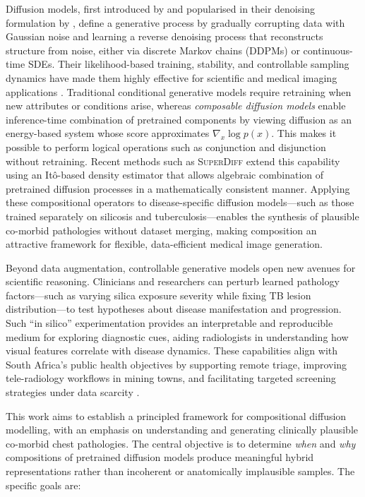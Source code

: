 Diffusion models, first introduced by \citet{pmlr-v37-sohl-dickstein15} and
popularised in their denoising formulation by \citet{NEURIPS2020_4c5bcfec},
define a generative process by gradually corrupting data with Gaussian noise and
learning a reverse denoising process that reconstructs structure from noise,
either via discrete Markov chains (DDPMs) or continuous-time SDEs. Their
likelihood-based training, stability, and controllable sampling dynamics have
made them highly effective for scientific and medical imaging applications
\citep{accelerated_mri_motion_correction_2023,score_based_diffusion_mri_2022}.
Traditional conditional generative models require retraining when new attributes
or conditions arise, whereas \emph{composable diffusion models} enable
inference-time combination of pretrained components by viewing diffusion as an
energy-based system whose score approximates $\nabla_x \log p(x)$. This makes it
possible to perform logical operations such as conjunction and disjunction
\citep{NEURIPS2020_49856ed4,liu2022compositional} without retraining. Recent
methods such as \textsc{SuperDiff} \citep{skreta2024superposition} extend this
capability using an Itô-based density estimator that allows algebraic
combination of pretrained diffusion processes in a mathematically consistent
manner. Applying these compositional operators to disease-specific diffusion
models—such as those trained separately on silicosis and tuberculosis—enables
the synthesis of plausible co-morbid pathologies without dataset merging, making
composition an attractive framework for flexible, data-efficient medical image
generation.


Beyond data augmentation, controllable generative models open new avenues for scientific reasoning.  
Clinicians and researchers can perturb learned pathology factors—such as varying silica exposure severity while fixing TB lesion distribution—to test hypotheses about disease manifestation and progression.  
Such “in silico” experimentation provides an interpretable and reproducible medium for exploring diagnostic cues, aiding radiologists in understanding how visual features correlate with disease dynamics.  
These capabilities align with South Africa’s public health objectives by supporting remote triage, improving tele-radiology workflows in mining towns, and facilitating targeted screening strategies under data scarcity \citep{SAJR2647}.


This work aims to establish a principled framework for compositional diffusion
modelling, with an emphasis on understanding and generating clinically plausible
co-morbid chest pathologies. The central objective is to determine \emph{when}
and \emph{why} compositions of pretrained diffusion models produce meaningful
hybrid representations rather than incoherent or anatomically implausible
samples. The specific goals are:

